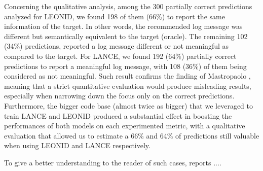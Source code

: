 Concerning the qualitative analysis, among the 300 partially correct predictions analyzed for LEONID, we found 198 of them (66\%) to report the same information of the target. In other words, the recommended log message was different but semantically equivalent to the target (\ie oracle). The remaining 102 (34\%) predictions, reported a log message different or not meaningful as compared to the target. 
For LANCE, we found 192 (64\%)  partially correct predictions to report a meaningful log message, with 108 (36\%) of them being considered as not meaningful.
Such result confirms the finding of Mastropaolo \etal \cite{mastropaolo2022using}, meaning that a strict quantitative evaluation would produce misleading results, especially when narrowing down the focus only on the correct predictions. 
Furthermore, the bigger code base (almost twice as bigger) that we leveraged to train LANCE and LEONID produced a substantial effect in boosting the performances of both models on each experimented metric, with a qualitative evaluation that allowed us to estimate a 66\% and 64\% of predictions still valuable when using LEONID and LANCE respectively.

To give a better understanding to the reader of such cases, \figref{} reports .... 









